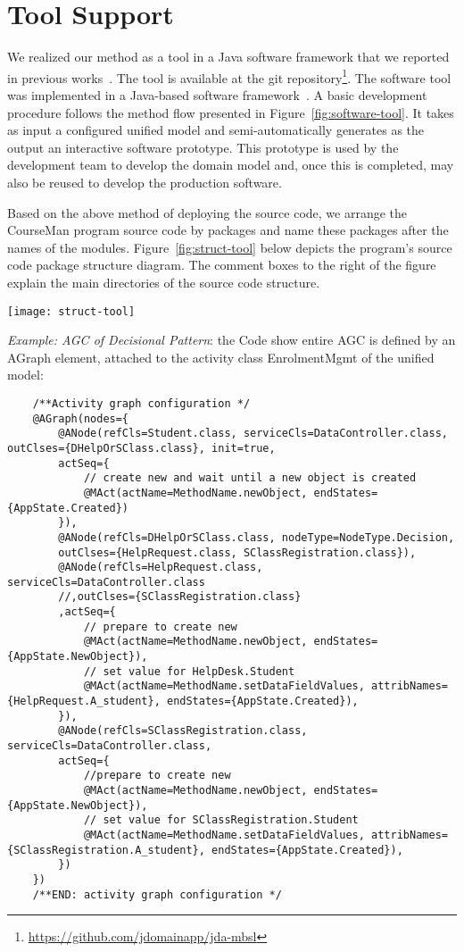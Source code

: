 \section{Tool Support}
\label{sect:tool} %
We realized our method as a tool in a Java software framework that we reported in previous works~\cite{le_domain_2018}. The tool is available at the git repository\footnote{\url{https://github.com/jdomainapp/jda-mbsl}}. The software tool was implemented in a Java-based software framework~\cite{le_jdomainapp_2017}. A basic development procedure follows the method flow presented in Figure~\ref{fig:software-tool}. It takes as input a configured unified model and semi-automatically generates as the output an interactive software prototype. This prototype is used by the development team to develop the domain model and, once this is completed, may also be reused to develop the production software.
%


Based on the above method of deploying the source code, we arrange the CourseMan program source code by packages and name these packages after the names of the modules. Figure~\ref{fig:struct-tool} below depicts the program's source code package structure diagram. The comment boxes to the right of the figure explain the main directories of the source code structure.
%
\begin{figure*}[ht]
	\centering
	\texttt{[image: struct-tool]}
	\caption{Structure diagram of the program source code} %
	\label{fig:struct-tool}
\end{figure*}
%

\textit{Example: AGC of Decisional Pattern}: the Code show entire AGC is defined by an AGraph element, attached to the activity class EnrolmentMgmt of the unified model:
\begin{verbatim}
	/**Activity graph configuration */
	@AGraph(nodes={
		@ANode(refCls=Student.class, serviceCls=DataController.class, outClses={DHelpOrSClass.class}, init=true, 
		actSeq={
			// create new and wait until a new object is created
			@MAct(actName=MethodName.newObject, endStates={AppState.Created})
		}),
		@ANode(refCls=DHelpOrSClass.class, nodeType=NodeType.Decision, 
		outClses={HelpRequest.class, SClassRegistration.class}),
		@ANode(refCls=HelpRequest.class, serviceCls=DataController.class 
		//,outClses={SClassRegistration.class}
		,actSeq={
			// prepare to create new
			@MAct(actName=MethodName.newObject, endStates={AppState.NewObject}),  
			// set value for HelpDesk.Student
			@MAct(actName=MethodName.setDataFieldValues, attribNames={HelpRequest.A_student}, endStates={AppState.Created}),  
		}),
		@ANode(refCls=SClassRegistration.class, serviceCls=DataController.class, 
		actSeq={
			//prepare to create new
			@MAct(actName=MethodName.newObject, endStates={AppState.NewObject}),  
			// set value for SClassRegistration.Student
			@MAct(actName=MethodName.setDataFieldValues, attribNames={SClassRegistration.A_student}, endStates={AppState.Created}),  
		})
	})
	/**END: activity graph configuration */
\end{verbatim}

